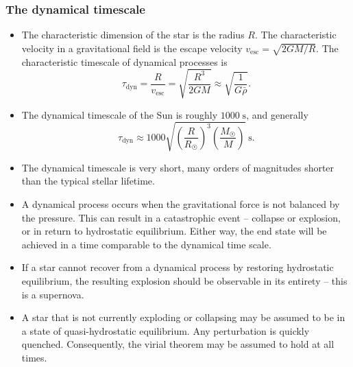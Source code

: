 \documentclass[]{article}
\newcommand{\unit}[1]{\;\mathrm{#1}}
\newcommand{\sub}[1]{_{\text{#1}}}
\newcommand{\rsun}{R_{\astrosun}}
\newcommand{\msun}{M_{\astrosun}}
\begin{document}
\subsubsection*{The dynamical timescale}
\begin{itemize}
\item The characteristic dimension of the star is the radius $R$. The
characteristic velocity in a gravitational field is the escape velocity
$v\sub{esc}=\sqrt{2GM/R}$. The characteristic timescale of dynamical processes
is
\begin{equation}
\tau\sub{dyn} = \frac{R}{v\sub{esc}} =
\sqrt{\frac{R^3}{2GM}} \approx \sqrt{\frac{1}{G\bar{\rho}}}.
\end{equation}

\item The dynamical timescale of the Sun is roughly $1000\unit{s}$, and
generally
\begin{equation}
\tau\sub{dyn} \approx
1000\sqrt{\left(\frac{R}{\rsun}\right)^3\left(\frac{\msun}{M}\right)}
\unit{s}.
\end{equation}

\item The dynamical timescale is very short, many orders of magnitudes shorter
than the typical stellar lifetime.

\item A dynamical process occurs when the gravitational force is not balanced
by the pressure. This can result in a catastrophic event -- collapse or
explosion, or in return to hydrostatic equilibrium. Either way, the end state
will be achieved in a time comparable to the dynamical time scale.

\item If a star cannot recover from a dynamical process by restoring hydrostatic
equilibrium, the resulting explosion should be observable in its entirety --
this is a supernova.

\item A star that is not currently exploding or collapsing may be assumed to be
in a state of quasi-hydrostatic equilibrium. Any perturbation is quickly
quenched. Consequently, the virial theorem may be assumed to hold at all times.
\end{itemize}
\end{document}
